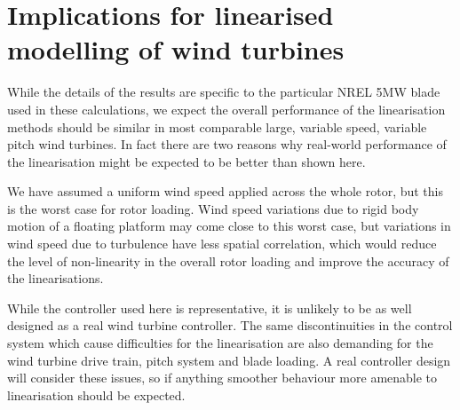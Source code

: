 \documentclass[preprint]{elsarticle}
\begin{document}

\section{Implications for linearised modelling of wind turbines}
\label{sec:discussion}

While the details of the results are specific to the particular NREL 5MW blade
used in these calculations, we expect the overall performance of the
linearisation methods should be similar in most comparable large, variable
speed, variable pitch wind turbines. In fact there are two reasons why
real-world performance of the linearisation might be expected to be better than
shown here.

We have assumed a uniform wind speed applied across the whole rotor, but this is
the worst case for rotor loading. Wind speed variations due to rigid body motion
of a floating platform may come close to this worst case, but variations in wind
speed due to turbulence have less spatial correlation, which would reduce the
level of non-linearity in the overall rotor loading and improve the accuracy of
the linearisations.

While the controller used here is representative, it is unlikely to be as well
designed as a real wind turbine controller. The same discontinuities in the
control system which cause difficulties for the linearisation are also demanding
for the wind turbine drive train, pitch system and blade loading. A real
controller design will consider these issues, so if anything smoother behaviour
more amenable to linearisation should be expected.
\end{document}
